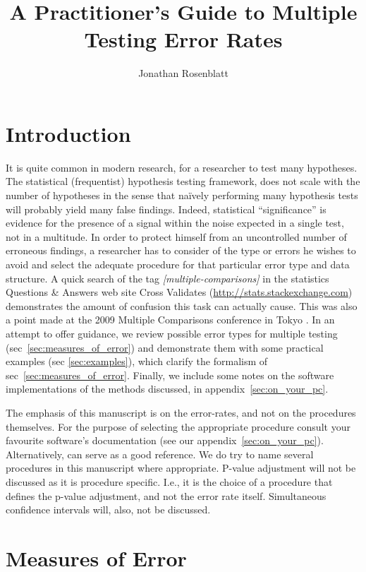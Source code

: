 \documentclass[review,12pt]{article}
\title{A Practitioner's Guide to Multiple Testing Error Rates}
\author{Jonathan Rosenblatt}
\date{}
\begin{document}
\maketitle


\section{Introduction}

It is quite common in modern research, for a researcher to test many hypotheses. 
The statistical (frequentist) hypothesis testing framework, does not scale with the number of hypotheses in the sense that na\"{i}vely performing many hypothesis tests will probably yield many false findings. 
Indeed, statistical ``significance'' is evidence for the presence of a signal within the noise expected in a single test, not in a multitude. 
In order to protect himself from an uncontrolled number of erroneous findings, a researcher has to consider of the type or errors he wishes to avoid and select the adequate procedure for that particular error type and data structure. 
A quick search of the tag \emph{[multiple-comparisons]} in the statistics Questions \& Answers web site Cross Validates (\url{http://stats.stackexchange.com}) demonstrates the amount of confusion this task can actually cause. This was also a point made at the 2009 Multiple Comparisons conference in Tokyo \citep[][section 4.4]{benjamini_simultaneous_2010}. 
In an attempt to offer guidance, we review possible error types for multiple testing (sec~\ref{sec:measures_of_error}) and demonstrate them with some practical examples (sec \ref{sec:examples}), which clarify the formalism of sec~\ref{sec:measures_of_error}. Finally, we include some notes on the software implementations of the methods discussed, in appendix~\ref{sec:on_your_pc}.

The emphasis of this manuscript is on the error-rates, and not on the procedures themselves. For the purpose of selecting the appropriate procedure consult your favourite software's documentation (see our appendix~\ref{sec:on_your_pc}). Alternatively, \citet{farcomeni_review_2008} can serve as a good reference. 
We do try to name several procedures in this manuscript where appropriate.  P-value adjustment will not be discussed as it is procedure specific. I.e., it is the choice of a procedure that defines the p-value adjustment, and not the error rate itself.
Simultaneous confidence intervals will, also, not be discussed.  


\section{\label{sec:measures_of_error}Measures of Error}
\end{document}
